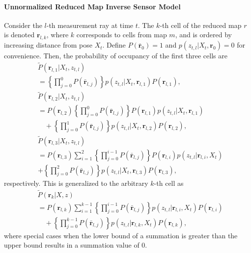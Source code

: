 \documentclass[letterpaper, 10pt, conference]{ieeeconf}
\begin{document}
\begin{appendix}
\label{append}

\paragraph{Unnormalized Reduced Map Inverse Sensor Model}
Consider the $l$-th measurement ray at time $t$. The $k$-th cell of the reduced map $r$ is denoted $\mathbf{r}_{l,k}$, where $k$ corresponds to cells from map $m$, and is ordered by increasing distance from pose $X_t$.
Define $P(\bar{\mathbf{r}}_0)=1$ and $p(z_{t,l}|X_t,\mathbf{r}_0)=0$ for convenience. Then, the probability of occupancy of the first three cells are
\begin{align}
\label{eqn:tildePk1}
&\tilde P(\mathbf{r}_{l,1}|X_t,z_{t,l})\nonumber\\&=\left\{\prod_{j=0}^0P(\bar{\mathbf{r}}_{l,j})\right\}p(z_{t,l}|X_t,\mathbf{r}_{l,1})P(\mathbf{r}_{l,1})
,
\\
&\tilde P(\mathbf{r}_{l,2}|X_t,z_{t,l})\nonumber\\&=
P(\mathbf{r}_{l,2})\left\{\prod_{j=0}^0P(\bar{\mathbf{r}}_{l,j})\right\}P(\mathbf{r}_{l,1})p(z_{t,l}|X_t,\mathbf{r}_{l,1})\nonumber\\&\quad+\left\{\prod_{j=0}^1P(\bar{\mathbf{r}}_{l,j})\right\}p(z_{t,l}|X_t,\mathbf{r}_{l,2})P(\mathbf{r}_{l,2})
,
\\
&\tilde P(\mathbf{r}_{l,3}|X_t,z_{t,l})\nonumber\\&=
P(\mathbf{r}_{l,3})\sum_{i=1}^2
\left\{\prod_{j=0}^{i-1}P(\bar{\mathbf{r}}_{l,j})\right\}P(\mathbf{r}_{l,i})p(z_{t,l}|\mathbf{r}_{l,i},X_t)\nonumber\\
&+\left\{\prod_{j=0}^2P(\bar{\mathbf{r}}_{l,j})\right\}p(z_{t,l}|X_t,\mathbf{r}_{l,3})P(\mathbf{r}_{l,3})
,
\end{align}
respectively. This is generalized to the arbitrary $k$-th cell as
\begin{align}
\label{eqn:GenSol}
&\tilde P(\mathbf{r}_k|X,z)
\nonumber\\&=P(\mathbf{r}_{l,k})\sum_{i=1}^{k-1}\left\{\prod_{j=0}^{i-1}P(\bar{\mathbf{r}}_{l,j})\right\}p(z_{t,l}|\mathbf{r}_{l,i},X_t)P(\mathbf{r}_{l,i})
\nonumber\\&\quad+
\left\{\prod_{j=0}^{k-1}P(\bar{\mathbf{r}}_{l,j})\right\}p(z_{t,l}|\mathbf{r}_{l,k},X_t)P(\mathbf{r}_{l,k}),
\end{align}
where special cases when the lower bound of a summation is greater than the upper bound results in a summation value of $0$.


\end{appendix}
\end{document}
